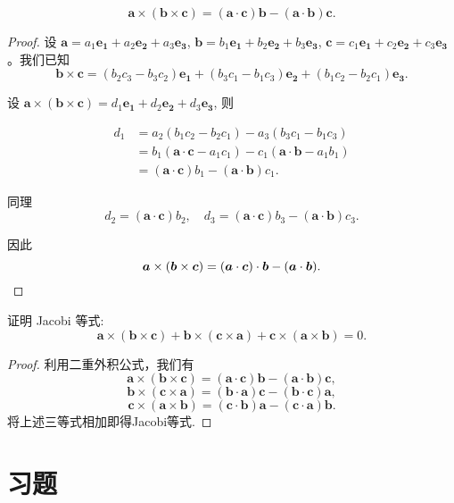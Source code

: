 \begin{lemma}[二重外积公式]
    $$
\bm{a} \times (\bm{b} \times \bm{c}) = (\bm{a} \cdot \bm{c})\bm{b} - (\bm{a} \cdot \bm{b})\bm{c}.
$$

\end{lemma}

\begin{proof}
   设 $\bm{a} = a_1 \bm{e_1} + a_2 \bm{e_2} + a_3 \bm{e_3}$, $\bm{b} = b_1 \bm{e_1} + b_2 \bm{e_2} + b_3 \bm{e_3}$, $\bm{c} = c_1 \bm{e_1} + c_2 \bm{e_2} + c_3 \bm{e_3}$。我们已知
$$
\bm{b} \times \bm{c} = (b_2 c_3 - b_3 c_2)\bm{e_1} + (b_3 c_1 - b_1 c_3)\bm{e_2} + (b_1 c_2 - b_2 c_1)\bm{e_3}.
$$

设 $\bm{a} \times (\bm{b} \times \bm{c}) = d_1 \bm{e_1} + d_2 \bm{e_2} + d_3 \bm{e_3}$, 则


\begin{align*}
    d_1 &= a_2 (b_1 c_2 - b_2 c_1) - a_3 (b_3 c_1 - b_1 c_3) \\
    &= b_1 (\bm{a} \cdot \bm{c} - a_1 c_1) - c_1 (\bm{a} \cdot \bm{b} - a_1 b_1)\\
    &= (\bm{a} \cdot \bm{c}) b_1 - (\bm{a} \cdot \bm{b}) c_1.
\end{align*}

同理
$$
d_2 = (\bm{a} \cdot \bm{c}) b_2, \quad d_3 = (\bm{a} \cdot \bm{c}) b_3 - (\bm{a} \cdot \bm{b}) c_3.
$$ 

因此
$$
\bm{a} \times ( \bm{b} \times \bm{c}) = (\bm{a} \cdot \bm{c}) \cdot \bm{b} - ( \bm{a} \cdot \bm{b}) .
$$
\end{proof}

\begin{proposition}
    证明 Jacobi 等式:
    $$
    \bm{a} \times (\bm{b} \times \bm{c}) + \bm{b} \times (\bm{c} \times \bm{a}) + \bm{c} \times (\bm{a} \times \bm{b}) = 0.
    $$
    \end{proposition}
    
    \begin{proof}
    利用二重外积公式，我们有
    $$
    \bm{a} \times (\bm{b} \times \bm{c}) = (\bm{a} \cdot \bm{c})\bm{b} - (\bm{a} \cdot \bm{b})\bm{c},
    $$
    $$
    \bm{b} \times (\bm{c} \times \bm{a}) = (\bm{b} \cdot \bm{a})\bm{c} - (\bm{b} \cdot \bm{c})\bm{a},
    $$
    $$
    \bm{c} \times (\bm{a} \times \bm{b}) = (\bm{c} \cdot \bm{b})\bm{a} - (\bm{c} \cdot \bm{a})\bm{b}.
    $$
    将上述三等式相加即得Jacobi等式.
    \end{proof}

\section{习题}

